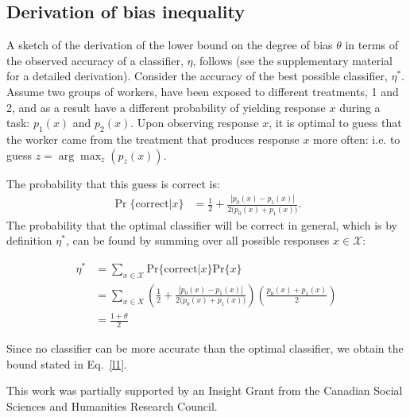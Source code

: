 \documentclass{pnastwo}
\begin{document}
\begin{article}
\begin{materials}
\section{Derivation of bias inequality}
A sketch of the derivation of the lower bound on the degree of bias 
$\theta$ in terms of the observed accuracy of a classifier, $\eta$, follows
(see the supplementary material for a detailed derivation). 
Consider the accuracy of the best possible classifier, $\eta^*$.  
Assume two groups of workers, have been
exposed to different treatments, 1 and 2, and as a result have
a different probability of yielding response $x$ during a task: 
$p_1(x)$ and $p_2(x)$.  Upon observing response $x$, it is optimal to guess 
that the worker came from the treatment that produces response $x$ more 
often: i.e. to guess $z=\arg\max_z(p_z(x))$.

The probability that this guess is correct is:
\begin{align}
	\Pr\{\mathrm{correct}\vert x\} 	&= \frac{1}{2} + \frac{|p_0(x) - p_1(x)|}{2 \big(p_0(x) + p_1(x) \big)}.
\end{align}
The probability that the optimal classifier will be correct in general,
which is by definition $\eta^*$, can be found by summing over all possible
responses $x \in \mathcal{X}$:

\begin{align}
	\eta^* &= \sum_{x \in \mathcal{X}} \mathrm{Pr}\{\mathrm{correct}\vert x\}
			\mathrm{Pr}\{x\} \\
		&= \sum_{x\in X} \left(
				\frac{1}{2} + 
				\frac{|p_0(x) - p_1(x)|}{2 \big(p_0(x) + p_1(x) \big)}
			\right)
			\left(
				\frac{p_0(x) + p_1(x)}{2}
			\right)\\
		&= \frac{1 + \theta}{2}
\end{align}

Since no classifier can be more accurate than the optimal classifier, we 
obtain the bound stated in Eq.~\ref{l1}.

\end{materials}

\begin{acknowledgments}
This work was partially supported by an Insight Grant from the Canadian Social Sciences and Humanities Research Council.
\end{acknowledgments}





\end{article}
\end{document}
